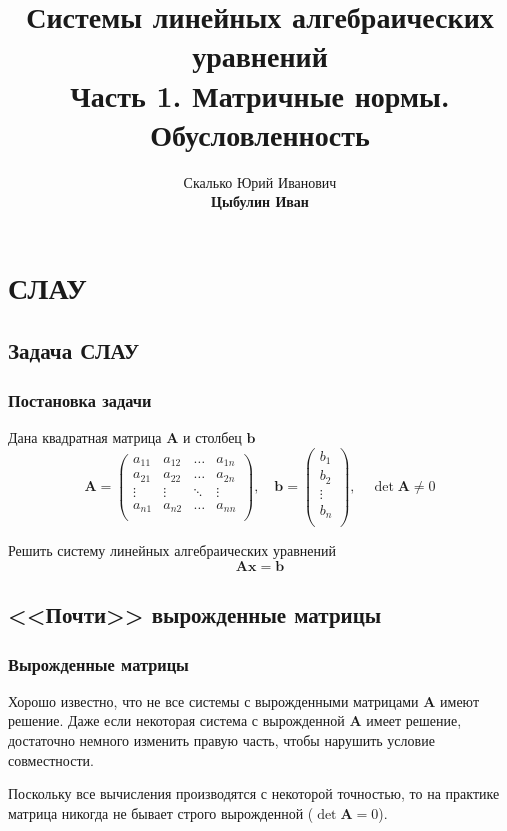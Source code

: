 \documentclass[apectratio=43,unicode]{beamer}
\title[СЛАУ]{Системы линейных алгебраических уравнений\\Часть 1. Матричные нормы. Обусловленность}
\author[Цыбулин И.В.]{Скалько Юрий Иванович\\
\textbf{Цыбулин Иван}}
\date{}
\begin{document}
\begin{frame}[plain]
\titlepage
\end{frame}

\newcommand\myframe[2]{\subsection{#1}\frame{\frametitle{#1}{#2}}}

\section{ }

\newcommand{\A}{{\mathbf{A}}}
\newcommand{\x}{{\mathbf{x}}}
\newcommand{\y}{{\mathbf{y}}}
\renewcommand{\b}{{\mathbf{b}}}

\newcommand{\one}{{\ell_1}}
\newcommand{\tr}{{\mathsf{T}}}

\section{СЛАУ}

\subsection{Задача СЛАУ}
\begin{frame}
\frametitle{Постановка задачи}
	Дана квадратная матрица $\A$ 	и столбец $\b$
	$$
	\A =
	\begin{pmatrix}
	a_{11}&a_{12}&\dots&a_{1n}\\
	a_{21}&a_{22}&\dots&a_{2n}\\
	\vdots&\vdots&\ddots&\vdots\\
	a_{n1}&a_{n2}&\dots&a_{nn}\\
	\end{pmatrix}
	,\quad
	\b =
	\begin{pmatrix}
	b_{1}\\
	b_{2}\\
	\vdots\\
	b_{n}\\
	\end{pmatrix}
	,\quad \det \A \neq 0
	$$

	Решить систему линейных алгебраических уравнений 
	$$
	\A\x = \b
	$$
\end{frame}

\subsection{<<Почти>> вырожденные матрицы}
\begin{frame}
\frametitle{Вырожденные матрицы}
	Хорошо известно, что не все системы с вырожденными матрицами $\A$ имеют решение.
	Даже если некоторая система с вырожденной $\A$ имеет решение, достаточно немного изменить правую часть, чтобы
	нарушить условие совместности.

	Поскольку все вычисления производятся с некоторой точностью, то на практике матрица
	никогда не бывает строго вырожденной ($\det \A = 0$).
\end{frame}
\end{document}

